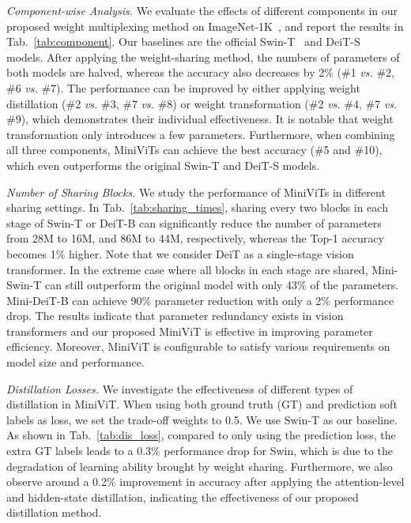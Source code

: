 \documentclass[10pt,twocolumn,letterpaper]{article}
\begin{document}
    \textit{Component-wise Analysis. } 
    We evaluate the effects of different components in our proposed weight multiplexing method on ImageNet-1K~\cite{imagenet}, and report the results in Tab.~\ref{tab:component}. Our baselines are the official Swin-T~\cite{Swin} and DeiT-S~\cite{deit} models. After applying the weight-sharing method, the numbers of parameters of both models are halved, whereas the accuracy also decreases by 2\% (\#1 \emph{vs.} \#2, \#6 \emph{vs.} \#7). The performance can be improved by either applying weight distillation (\#2 \emph{vs.} \#3, \#7 \emph{vs.} \#8) or weight transformation (\#2 \emph{vs.} \#4, \#7 \emph{vs.} \#9), which demonstrates their individual effectiveness. It is notable that weight transformation only introduces a few parameters. Furthermore, when combining all three components, MiniViTs can achieve the best accuracy (\#5 and \#10), which even outperforms the original Swin-T and DeiT-S models.

    \textit{Number of Sharing Blocks.} We study the performance of MiniViTs in different sharing settings. In Tab.~\ref{tab:sharing_times}, 
    sharing every two blocks in each stage of Swin-T or DeiT-B can significantly reduce the number of parameters from 28M to 16M, and 86M to 44M, respectively, whereas the Top-1 accuracy becomes 1\% higher. Note that we consider DeiT as a single-stage vision transformer. In the extreme case where all blocks in each stage are shared, Mini-Swin-T can still outperform the original model with only 43\% of the parameters. Mini-DeiT-B can achieve 90\% parameter reduction with only a 2\% performance drop. The results indicate that parameter redundancy exists in vision transformers and our proposed MiniViT is effective in improving parameter efficiency. Moreover, MiniViT is configurable to satisfy various requirements on model size and performance.
  
    \textit{Distillation Losses.} We investigate the effectiveness of different types of distillation in MiniViT. 
    When using both ground truth (GT) and prediction soft labels as loss,
    we set the trade-off weights to 0.5. We use Swin-T as our baseline. As shown in Tab.~\ref{tab:dis_loss},
    compared to only using the prediction loss,
    the extra GT labels leads to a 0.3\% performance drop for Swin, which is due to the degradation of learning ability brought by weight sharing.
    Furthermore, we also observe around a 0.2\% 
    improvement in accuracy after applying the attention-level and hidden-state distillation, indicating the effectiveness of our proposed distillation method. 
\end{document}
